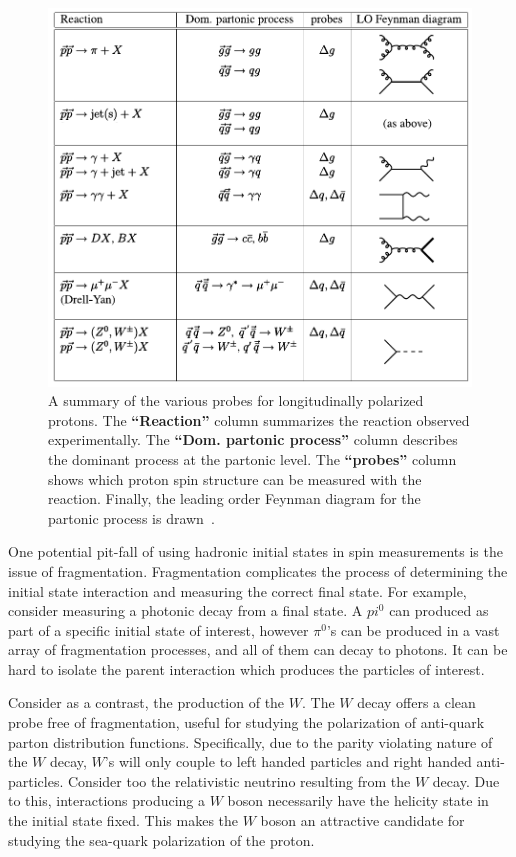 \begin{figure}[ht]
  \centering
  \includegraphics[width=\linewidth]{./figures/spin_probes.pdf}
  \caption{
    A summary of the various probes for longitudinally polarized protons. The
    \textbf{``Reaction''} column summarizes the reaction observed
    experimentally.  The \textbf{``Dom. partonic process''} column describes the
    dominant process at the partonic level. The \textbf{``probes''} column shows
    which proton spin structure can be measured with the reaction. Finally, the
    leading order Feynman diagram for the partonic process is
    drawn~\cite{Aidala2005}.
  }
  \label{fig:spin_probes_masterspin}

\end{figure}

One potential pit-fall of using hadronic initial states in spin measurements is
the issue of fragmentation. Fragmentation complicates the process of determining
the initial state interaction and measuring the correct final state. For
example, consider measuring a photonic decay from a final state. A $pi^0$ can
produced as part of a specific initial state of interest, however $\pi^0$'s can
be produced in a vast array of fragmentation processes, and all of them can
decay to photons. It can be hard to isolate the parent interaction which
produces the particles of interest. 

Consider as a contrast, the production of the $W$. The $W$ decay offers a
clean probe free of fragmentation, useful for studying the polarization of
anti-quark parton distribution functions. Specifically, due to the parity
violating nature of the $W$ decay, $W$'s  will only couple to left handed
particles and right handed anti-particles. Consider too the relativistic
neutrino resulting from the $W$ decay. Due to this, interactions producing a $W$
boson necessarily have the helicity state in the initial state fixed. This makes
the $W$ boson an attractive candidate for studying the sea-quark polarization of
the proton.

